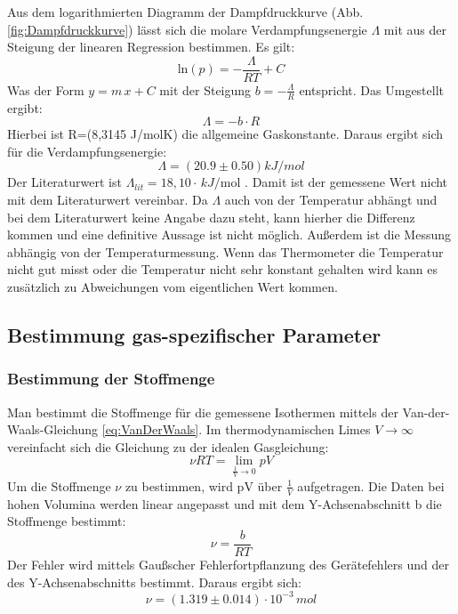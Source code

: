     Aus dem logarithmierten Diagramm der Dampfdruckkurve (Abb. \ref{fig:Dampfdruckkurve}) lässt sich die molare Verdampfungsenergie \(\Lambda\) mit aus der Steigung der linearen Regression bestimmen.
    Es gilt:
    \begin{equation}
        \text{ln}(p) = -\frac{\Lambda}{RT} + C
    \end{equation}
    Was der Form $y = m \, x + C$ mit der Steigung $b = -\frac{\Lambda}{R}$ entspricht.
    Das Umgestellt ergibt:
    \begin{equation}
        \Lambda = -  b\cdot R
    \label{eq:Verdampfungsenergie}
    \end{equation}
    Hierbei ist R=(8,3145 J/molK) \cite{Gaskonstante} die allgemeine Gaskonstante.
    Daraus ergibt sich für die Verdampfungsenergie:
    \begin{equation}
        \Lambda = (20.9 \pm 0.50) kJ/mol
    \end{equation}
    Der Literaturwert ist \(\Lambda_{lit} = 18,10 \cdot \, kJ/\text{mol}\) \cite{Verdampfungsenergie}. Damit ist der gemessene Wert nicht mit dem
    Literaturwert vereinbar. 
    Da $\Lambda$ auch von der Temperatur abhängt und bei dem Literaturwert keine Angabe dazu steht, kann hierher die Differenz kommen 
    und eine definitive Aussage ist nicht möglich. 
    Außerdem ist die Messung abhängig von der Temperaturmessung. 
    Wenn das Thermometer die Temperatur nicht gut misst oder die Temperatur nicht sehr konstant gehalten wird kann es zusätzlich zu Abweichungen vom eigentlichen Wert kommen.

    \subsection{Bestimmung gas-spezifischer Parameter}

    \subsubsection{Bestimmung der Stoffmenge}

    Man bestimmt die Stoffmenge für die gemessene Isothermen mittels der Van-der-Waals-Gleichung \ref{eq:VanDerWaals}.
    Im thermodynamischen Limes $V \to \infty$ vereinfacht sich die Gleichung zu der idealen Gasgleichung:
    \begin{equation}
        \nu RT = \lim_{\frac{1}{V} \to 0} pV
    \end{equation}
    Um die Stoffmenge $\nu$ zu bestimmen, wird pV über $\frac{1}{V}$ aufgetragen. Die Daten bei hohen Volumina werden linear angepasst
    und mit dem Y-Achsenabschnitt b die Stoffmenge bestimmt:
    \begin{equation}
        \nu = \frac{b}{R T}
    \end{equation}
    Der Fehler wird mittels Gaußscher Fehlerfortpflanzung des Gerätefehlers und der des Y-Achsenabschnitts bestimmt. Daraus ergibt sich:
    \begin{equation}
        \nu = (1.319 \pm 0.014) \cdot 10^{-3} \, mol
    \end{equation}

